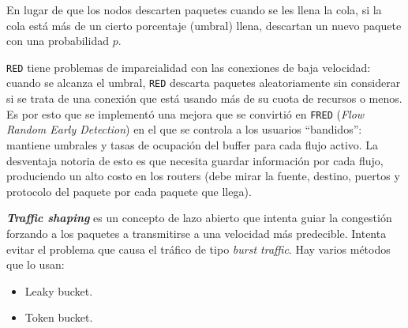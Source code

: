 \documentclass[]{article}
\begin{document}
En lugar de que los nodos descarten paquetes cuando se les llena la cola, si la cola está más de un cierto porcentaje (umbral) llena, descartan un nuevo paquete con una probabilidad $p$.

\texttt{RED} tiene problemas de imparcialidad con las conexiones de baja velocidad: cuando se alcanza el umbral, \texttt{RED} descarta paquetes aleatoriamente sin considerar si se trata de una conexión que está usando más de su cuota de recursos o menos. Es por esto que se implementó una mejora que se convirtió en \texttt{FRED} (\emph{Flow Random Early Detection}) en el que se controla a los usuarios ``bandidos'': mantiene umbrales y tasas de ocupación del buffer para cada flujo activo. La desventaja notoria de esto es que necesita guardar información por cada flujo, produciendo un alto costo en los routers (debe mirar la fuente, destino, puertos y protocolo del paquete por cada paquete que llega).

\emph{\textbf{Traffic shaping}} es un concepto de lazo abierto que intenta guiar la congestión forzando a los paquetes a transmitirse a una velocidad más predecible. Intenta evitar el problema que causa el tráfico de tipo \emph{burst traffic}. Hay varios métodos que lo usan:
\begin{itemize}
    \item Leaky bucket.
    \item Token bucket.
\end{itemize}






\end{document}
